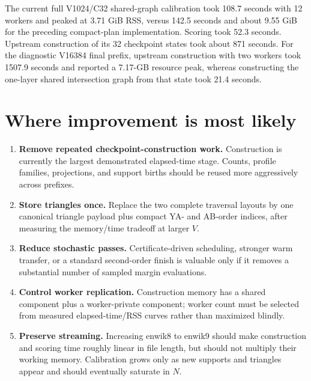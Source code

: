 \documentclass[11pt]{article}
\begin{document}
The current full V1024/C32 shared-graph calibration took 108.7 seconds with
12 workers and peaked at 3.71 GiB RSS, versus 142.5 seconds and about 9.55 GiB
for the preceding compact-plan implementation.  Scoring took 52.3 seconds.
Upstream construction of its 32 checkpoint states took about 871 seconds.
For the diagnostic V16384 final prefix, upstream construction with two
workers took 1507.9 seconds and reported a 7.17-GB resource peak, whereas constructing the
one-layer shared intersection graph from that state took 21.4 seconds.

\section{Where improvement is most likely}

\begin{enumerate}
\item \textbf{Remove repeated checkpoint-construction work.}  Construction is
currently the largest demonstrated elapsed-time stage.  Counts, profile
families, projections, and support births should be reused more aggressively
across prefixes.
\item \textbf{Store triangles once.}  Replace the two complete traversal
layouts by one canonical triangle payload plus compact YA- and AB-order
indices, after measuring the memory/time tradeoff at larger $V$.
\item \textbf{Reduce stochastic passes.}  Certificate-driven scheduling,
stronger warm transfer, or a standard second-order finish is valuable only if
it removes a substantial number of sampled margin evaluations.
\item \textbf{Control worker replication.}  Construction memory has a shared
component plus a worker-private component; worker count must be selected from
measured elapsed-time/RSS curves rather than maximized blindly.
\item \textbf{Preserve streaming.}  Increasing enwik8 to enwik9 should make
construction and scoring time roughly linear in file length, but should not
multiply their working memory.  Calibration grows only as new supports and
triangles appear and should eventually saturate in $N$.
\end{enumerate}
\end{document}
